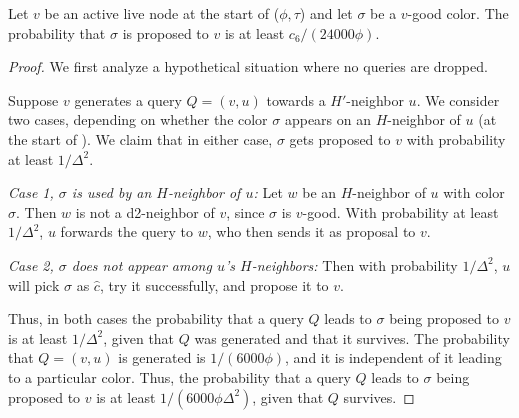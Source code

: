 \begin{lemma}
Let $v$ be an active live node at the start of ($\phi,\tau$) and let $\sigma$ be a $v$-good color. The probability that $\sigma$ is proposed to $v$ is at least $c_6/(24000\phi)$.
\label{L:sigma}
\end{lemma}
\begin{proof}
We first analyze a hypothetical situation where no queries are dropped.

Suppose $v$ generates a query $Q=(v,u)$ towards a $H'$-neighbor $u$.
%
We consider two cases, depending on whether the color $\sigma$ appears on an $H$-neighbor of $u$ (at the start of ). We claim that in either case, $\sigma$ gets proposed to $v$ with probability at least $1/\Delta^2$.

\textit{Case 1, $\sigma$ is used by an $H$-neighbor  of $u$: } Let $w$ be an $H$-neighbor of $u$ with color $\sigma$. Then $w$ is not a d2-neighbor of $v$, since $\sigma$ is $v$-good.
With probability at least $1/\Delta^2$, $u$ forwards the query to $w$, who then sends it as proposal to $v$.

\textit{Case 2, $\sigma$ does not appear among $u$'s $H$-neighbors:} Then with probability $1/\Delta^2$, $u$ will pick $\sigma$ as $\hat{c}$, try it successfully, and propose it to $v$.

Thus, in both cases the probability that a query $Q$ leads to $\sigma$ being proposed to $v$ is at least $1/\Delta^2$, given that $Q$ was generated and that it survives.
The probability that $Q=(v,u)$ is generated is $1/(6000\phi)$, and it is independent of it leading to a particular color.
Thus, the probability that a query $Q$ leads to $\sigma$ being proposed to $v$ is at least $1/(6000\phi\Delta^2)$, given that $Q$ survives. 



\end{proof}
